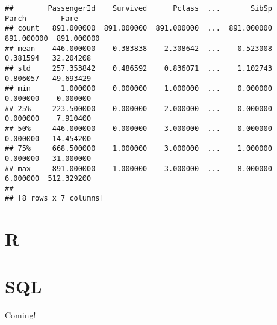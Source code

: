 \documentclass[
]{book}
\begin{document}
\begin{verbatim}
##        PassengerId    Survived      Pclass  ...       SibSp       Parch        Fare
## count   891.000000  891.000000  891.000000  ...  891.000000  891.000000  891.000000
## mean    446.000000    0.383838    2.308642  ...    0.523008    0.381594   32.204208
## std     257.353842    0.486592    0.836071  ...    1.102743    0.806057   49.693429
## min       1.000000    0.000000    1.000000  ...    0.000000    0.000000    0.000000
## 25%     223.500000    0.000000    2.000000  ...    0.000000    0.000000    7.910400
## 50%     446.000000    0.000000    3.000000  ...    0.000000    0.000000   14.454200
## 75%     668.500000    1.000000    3.000000  ...    1.000000    0.000000   31.000000
## max     891.000000    1.000000    3.000000  ...    8.000000    6.000000  512.329200
## 
## [8 rows x 7 columns]
\end{verbatim}

\hypertarget{r}{%
\chapter{R}\label{r}}

\hypertarget{sql}{%
\chapter{SQL}\label{sql}}

Coming!

  
\end{document}
